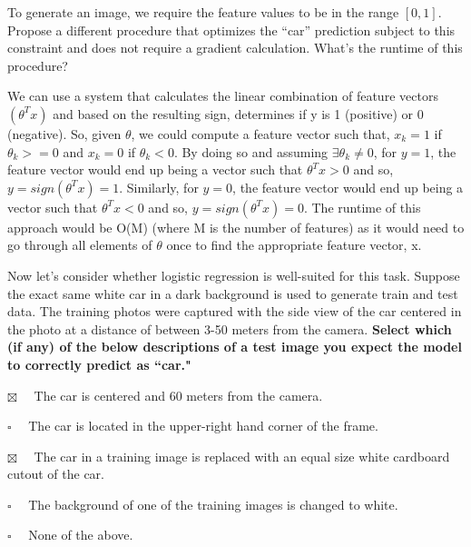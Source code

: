\documentclass[11pt,addpoints,answers]{exam}
\newcommand{\emptysquare}{{\LARGE $\square$}\ \ }
\newcommand{\filledsquare}{{\LARGE $\boxtimes$}\ \ }
\begin{document}
\begin{questions}
\clearpage

\question[2] To generate an image, we require the feature values to be in the range $[0,1]$. Propose a different procedure that optimizes the “car” prediction subject to this constraint and does not require a gradient calculation. What’s the runtime of this procedure? 

\begin{your_solution}[height=5cm]
We can use a system that calculates the linear combination of feature vectors $(\theta^Tx)$ and based on the resulting sign, determines if y is 1 (positive) or 0 (negative). So, given $\theta$, we could compute a feature vector such that, $x_k = 1$ if $\theta_k >= 0$ and $x_k = 0$ if $\theta_k < 0$. By doing so and assuming  $\exists \theta_k \neq 0$, for $y = 1$, the feature vector would end up being a vector such that $\theta^Tx > 0$ and so, $y = sign(\theta^Tx) = 1$. Similarly, for $y = 0$, the feature vector would end up being a vector such that $\theta^Tx < 0$ and so, $y = sign(\theta^Tx) = 0$.\newline
The runtime of this approach would be O(M) (where M is the number of features) as it would need to go through all elements of $\theta$ once to find the appropriate feature vector, x. 
\end{your_solution}




\question[2] Now let's consider whether logistic regression is well-suited for this task. Suppose the exact same white car in a dark background is used to generate train and test data. The training photos were captured with the side view of the car centered in the photo at a distance of between 3-50 meters from the camera.  
\textbf{Select which (if any) of the below descriptions of a test image you expect the model to correctly predict as ``car."}
    \begin{list}{}
        \item 
            \filledsquare
            The car is centered and 60 meters from the camera.
        \item 
            \emptysquare
            The car is located in the upper-right hand corner of the frame.
        \item 
            \filledsquare
           The car in a training image is replaced with an equal size white cardboard cutout of the car.
        \item 
            \emptysquare
            The background of one of the training images is changed to white.
        \item 
            \emptysquare
            None of the above.
    \end{list}


\end{questions}
\end{document}
